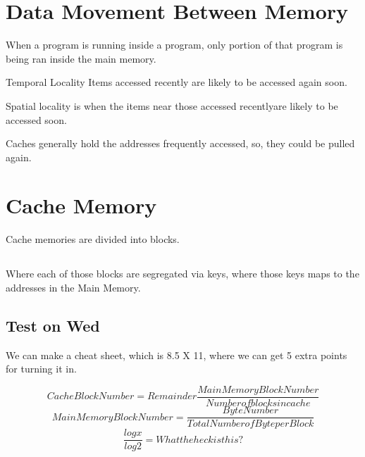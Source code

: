 \documentclass{article}
\begin{document}
\date{June 18, 2018}
\section{Data Movement Between Memory}
When a program is running inside a program, only portion of that program is being ran inside the main memory.

Temporal Locality Items accessed recently are likely to be accessed again soon.

Spatial locality is when the items near those accessed recentlyare likely to be accessed soon.

Caches generally hold the addresses frequently accessed, so, they could be pulled again.

\section{Cache Memory}
Cache memories are divided into blocks.

\subsection{}
Where each of those blocks are segregated via keys, where those keys maps to the addresses in the Main Memory.

\subsection{Test on Wed}
We can make a cheat sheet, which is 8.5 X 11, where we can get 5 extra points for turning it in.

\begin{equation}
Cache Block Number = Remainder\frac{Main Memory Block Number}{Number of blocks in cache}
\end{equation}
\begin{equation}
Main Memory Block Number = \frac{Byte Number}{Total Number of Byte per Block}
\end{equation}
\begin{equation}
\frac{logx}{log2}=What the heck is this?
\end{equation}
\end{document}
